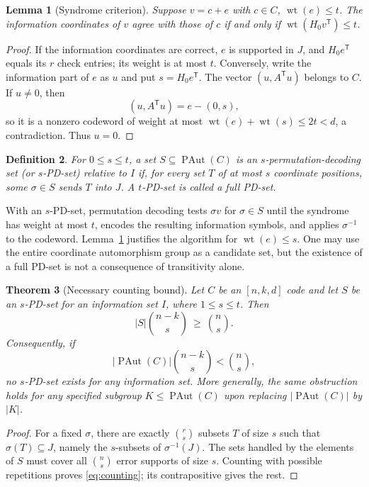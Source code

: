 \documentclass[12pt]{article}
\newtheorem{theorem}{Theorem}[section]
\newtheorem{lemma}[theorem]{Lemma}
\newtheorem{definition}[theorem]{Definition}
\numberwithin{equation}{section}
\newcommand{\wt}{\operatorname{wt}}
\newcommand{\PAut}{\operatorname{PAut}}
\begin{document}
\begin{lemma}[Syndrome criterion]\label{lem:syndrome}
Suppose $v=c+e$ with $c\in C$, $\wt(e)\leq t$.
The information coordinates of $v$ agree with those of $c$
if and only if $\wt(H_0v^{\mathsf T})\leq t$.
\end{lemma}
\begin{proof}
If the information coordinates are correct, $e$ is supported
in $J$, and $H_0e^{\mathsf T}$ equals its $r$ check entries;
its weight is at most $t$.  Conversely, write the information
part of $e$ as $u$ and put $s=H_0e^{\mathsf T}$.
The vector $(u,A^{\mathsf T}u)$ belongs to $C$.  If $u\ne0$, then
\[
(u,A^{\mathsf T}u)=e-(0,s),
\]
so it is a nonzero codeword of weight at most
$\wt(e)+\wt(s)\leq2t<d$, a contradiction.
Thus $u=0$.
\end{proof}

\begin{definition}\label{def:pd-set}
For $0\leq s\leq t$, a set
$S\subseteq\PAut(C)$ is an \emph{$s$-permutation-decoding set}
(or $s$-PD-set) relative to $I$ if, for every set $T$ of at
most $s$ coordinate positions, some $\sigma\in S$ sends
$T$ into $J$.  A $t$-PD-set is called a full PD-set.
\end{definition}

With an $s$-PD-set, permutation decoding tests $\sigma v$
for $\sigma\in S$ until the syndrome has weight at most $t$,
encodes the resulting information symbols, and applies
$\sigma^{-1}$ to the codeword.  Lemma~\ref{lem:syndrome}
justifies the algorithm for $\wt(e)\leq s$.
One may use the entire coordinate automorphism group as a
candidate set, but the existence of a full PD-set is not
a consequence of transitivity alone.

\begin{theorem}[Necessary counting bound]\label{thm:counting}
Let $C$ be an $[n,k,d]$ code and let $S$ be an $s$-PD-set
for an information set $I$, where $1\leq s\leq t$.
Then
\begin{equation}\label{eq:counting}
|S|\binom{n-k}{s}\ \geq\ \binom ns.
\end{equation}
Consequently, if
\begin{equation}\label{eq:counting-fails}
|\PAut(C)|\binom{n-k}{s}<\binom ns,
\end{equation}
no $s$-PD-set exists for any information set.
More generally, the same obstruction holds for any
specified subgroup $K\leq\PAut(C)$ upon replacing
$|\PAut(C)|$ by $|K|$.
\end{theorem}
\begin{proof}
For a fixed $\sigma$, there are exactly
$\binom{r}{s}$ subsets $T$ of size $s$ such that
$\sigma(T)\subseteq J$, namely the $s$-subsets of
$\sigma^{-1}(J)$.  The sets handled by the elements of $S$
must cover all $\binom ns$ error supports of size $s$.
Counting with possible repetitions proves
\eqref{eq:counting}; its contrapositive gives the rest.
\end{proof}
\end{document}
